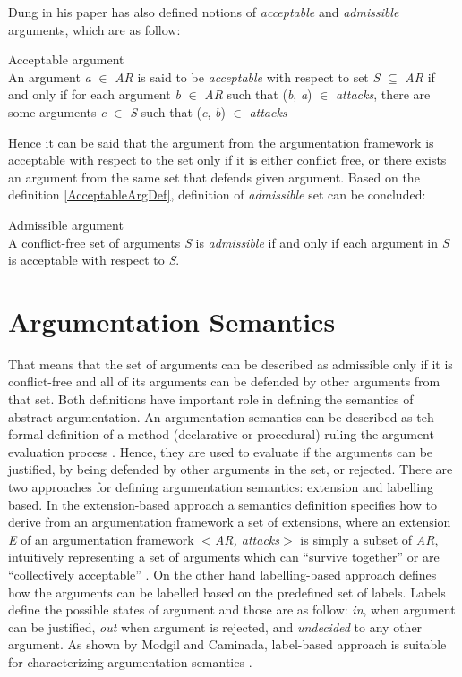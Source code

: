 Dung in his paper \citep{dung1995} has also defined notions of \textit{acceptable} and \textit{admissible} arguments, which are as follow:

\begin{definition}{Acceptable argument}
\label{AcceptableArgDef}\\
An argument \textit{a} $\in$ \textit{AR} is said to be \textit{acceptable} with respect to set \textit{S} $\subseteq$ \textit{AR} if and only if for each argument \textit{b} $\in$ \textit{AR} such that (\textit{b}, \textit{a}) $\in$ \textit{attacks}, there are some arguments \textit{c} $\in$ \textit{S} such that (\textit{c}, \textit{b}) $\in$ \textit{attacks}
\end{definition}

Hence it can be said that the argument from the argumentation framework is acceptable with respect to the set only if it is either conflict free, or there exists an argument from the same set that defends given argument. Based on the definition \ref{AcceptableArgDef}, definition of \textit{admissible} set can be concluded:

\begin{definition}{Admissible argument}
\label{AdmissibleArgDef}\\
A conflict-free set of arguments \textit{S} is \textit{admissible} if and only if each argument in \textit{S} is acceptable with respect to \textit{S}.
\end{definition}

\section{Argumentation Semantics}
That means that the set of arguments can be described as admissible only if it is conflict-free and all of its arguments can be defended by other arguments from that set. Both definitions have important role in defining the semantics of abstract argumentation. An argumentation semantics can be described as teh formal definition of a method (declarative or procedural) ruling the argument evaluation process \citep{baroni2009semantics}. Hence, they are used to evaluate if the arguments can be justified, by being defended by other arguments in the set, or rejected. There are two approaches for defining argumentation semantics: extension and labelling based. In the extension-based approach a semantics definition specifies how to derive from an argumentation framework a set of extensions, where an extension \textit{E} of an argumentation framework $<$\textit{AR, attacks}$>$ is simply a subset of \textit{AR}, intuitively representing a set of arguments which can “survive together” or are “collectively acceptable” \citep{baroni2009semantics}. On the other hand labelling-based approach defines how the arguments can be labelled based on the predefined set of labels. Labels define the possible states of argument and those are as follow: \textit{in}, when argument can be justified, \textit{out} when argument is rejected, and \textit{undecided} to any other argument. As shown by Modgil and Caminada, label-based approach is suitable for characterizing argumentation semantics \citep{modgil2009proof}.

